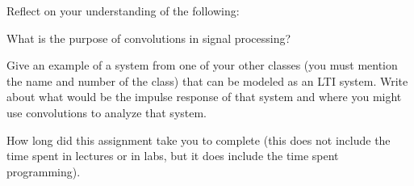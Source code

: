 \documentclass{ee102_pset}
\begin{document}





Reflect on your understanding of the following:

\problempart [4 points] What is the purpose of convolutions in signal processing?

\problempart [4 points] Give an example of a system from one of your other classes (you must mention the name and number of the class) that can be modeled as an LTI system. Write about what would be the impulse response of that system and where you might use convolutions to analyze that system.

\problempart [2 points] How long did this assignment take you to complete (this does not include the time spent in lectures or in labs, but it does include the time spent programming).
\end{document}
